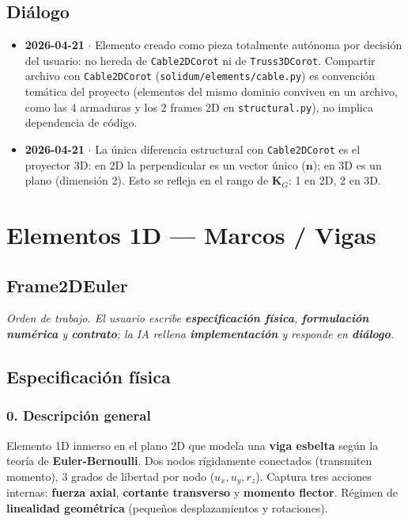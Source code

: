 \documentclass[11pt,letterpaper,oneside]{report}
\begin{document}
\section{Diálogo}

\begin{itemize}
  \item \textbf{2026-04-21} \ensuremath{\cdot} Elemento creado como pieza totalmente autónoma por decisión del usuario: no hereda de \texttt{Cable2DCorot} ni de \texttt{Truss3DCorot}. Compartir archivo con \texttt{Cable2DCorot} (\texttt{solidum/elements/cable.py}) es convención temática del proyecto (elementos del mismo dominio conviven en un archivo, como las 4 armaduras y los 2 frames 2D en \texttt{structural.py}), no implica dependencia de código.
  \item \textbf{2026-04-21} \ensuremath{\cdot} La única diferencia estructural con \texttt{Cable2DCorot} es el proyector 3D: en 2D la perpendicular es un vector único ($\mathbf n$); en 3D es un plano (dimensión 2). Esto se refleja en el rango de $\mathbf K_G$: 1 en 2D, 2 en 3D.
\end{itemize}


\newpage

\chapter{Elementos 1D — Marcos / Vigas}

\section{Frame2DEuler}



\textit{Orden de trabajo. El usuario escribe \textbf{especificación física}, \textbf{formulación numérica} y \textbf{contrato}; la IA rellena \textbf{implementación} y responde en \textbf{diálogo}.}



\section{Especificación física}

\subsection{0. Descripción general}
Elemento 1D inmerso en el plano 2D que modela una \textbf{viga esbelta} según la teoría de \textbf{Euler-Bernoulli}. Dos nodos rígidamente conectados (transmiten momento), 3 grados de libertad por nodo ($u_x, u_y, r_z$). Captura tres acciones internas: \textbf{fuerza axial}, \textbf{cortante transverso} y \textbf{momento flector}. Régimen de \textbf{linealidad geométrica} (pequeños desplazamientos y rotaciones).
\end{document}
